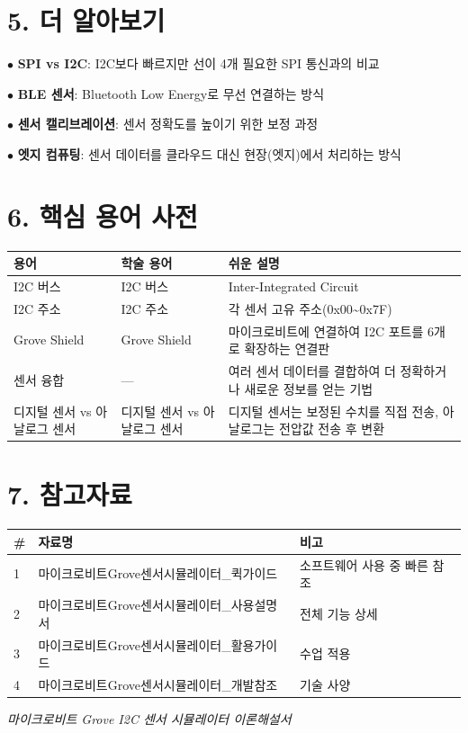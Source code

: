 \documentclass[11pt,a4paper]{article}
\begin{document}
\section*{5. 더 알아보기}

$\bullet$ \textbf{SPI vs I2C}: I2C보다 빠르지만 선이 4개 필요한 SPI 통신과의 비교

$\bullet$ \textbf{BLE 센서}: Bluetooth Low Energy로 무선 연결하는 방식

$\bullet$ \textbf{센서 캘리브레이션}: 센서 정확도를 높이기 위한 보정 과정

$\bullet$ \textbf{엣지 컴퓨팅}: 센서 데이터를 클라우드 대신 현장(엣지)에서 처리하는 방식



\section*{6. 핵심 용어 사전}

\begin{center}
\renewcommand{\arraystretch}{1.4}
\begin{tabular}{|p{3.4cm}|p{3.4cm}|p{8.2cm}|}
\hline
\rowcolor{tableheader}
\textbf{용어} & \textbf{학술 용어} & \textbf{쉬운 설명} \\
\hline
I2C 버스 & I2C 버스 & Inter-Integrated Circuit \\
\hline
I2C 주소 & I2C 주소 & 각 센서 고유 주소(0x00\textasciitilde{}0x7F) \\
\hline
Grove Shield & Grove Shield & 마이크로비트에 연결하여 I2C 포트를 6개로 확장하는 연결판 \\
\hline
센서 융합 & — & 여러 센서 데이터를 결합하여 더 정확하거나 새로운 정보를 얻는 기법 \\
\hline
디지털 센서 vs 아날로그 센서 & 디지털 센서 vs 아날로그 센서 & 디지털 센서는 보정된 수치를 직접 전송, 아날로그는 전압값 전송 후 변환 \\
\hline
\end{tabular}
\end{center}


\section*{7. 참고자료}

\begin{center}
\renewcommand{\arraystretch}{1.4}
\begin{tabular}{|p{1.5cm}|p{7.7cm}|p{5.8cm}|}
\hline
\rowcolor{tableheader}
\textbf{\#} & \textbf{자료명} & \textbf{비고} \\
\hline
1 & 마이크로비트Grove센서시뮬레이터\_퀵가이드 & 소프트웨어 사용 중 빠른 참조 \\
\hline
2 & 마이크로비트Grove센서시뮬레이터\_사용설명서 & 전체 기능 상세 \\
\hline
3 & 마이크로비트Grove센서시뮬레이터\_활용가이드 & 수업 적용 \\
\hline
4 & 마이크로비트Grove센서시뮬레이터\_개발참조 & 기술 사양 \\
\hline
\end{tabular}
\end{center}


\vfill
\begin{center}
\small\color{lightbrown}
\textit{마이크로비트 Grove I2C 센서 시뮬레이터 이론해설서}
\end{center}
\end{document}
